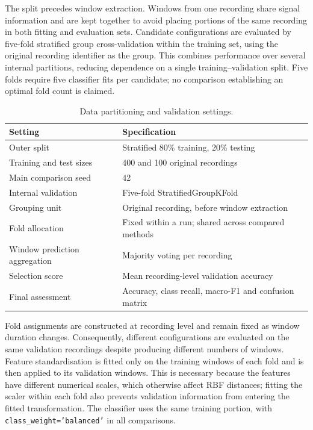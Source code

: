 The split precedes window extraction. Windows from one recording share signal
information and are kept together to avoid placing portions of the same
recording in both fitting and evaluation sets. Candidate configurations are
evaluated by five-fold stratified group cross-validation within the training
set, using the original recording identifier as the group. This combines
performance over several internal partitions, reducing dependence on a single
training--validation split. Five folds require five classifier fits per
candidate; no comparison establishing an optimal fold count is claimed.

\begin{table}[htbp]
\centering
\caption{Data partitioning and validation settings.}
\label{tab:data-validation-settings}
\renewcommand{\arraystretch}{1.15}
\begin{tabular}{lp{}}
\hline
Setting & Specification \\
\hline
Outer split & Stratified 80\% training, 20\% testing \\
Training and test sizes & 400 and 100 original recordings \\
Main comparison seed & 42 \\
Internal validation & Five-fold StratifiedGroupKFold \\
Grouping unit & Original recording, before window extraction \\
Fold allocation & Fixed within a run; shared across compared methods \\
Window prediction aggregation & Majority voting per recording \\
Selection score & Mean recording-level validation accuracy \\
Final assessment & Accuracy, class recall, macro-F1 and confusion matrix \\
\hline
\end{tabular}
\end{table}

Fold assignments are constructed at recording level and remain fixed as window
duration changes. Consequently, different configurations are evaluated on the
same validation recordings despite producing different numbers of windows.
Feature standardisation is fitted only on the training windows of each fold
and is then applied to its validation windows. This is necessary because the
features have different numerical scales, which otherwise affect RBF distances;
fitting the scaler within each fold also prevents validation information from
entering the fitted transformation. The classifier uses the same training
portion, with \texttt{class\_weight='balanced'} in all comparisons.

